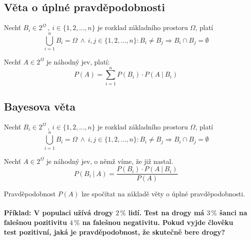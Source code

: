 \subsection{Věta o úplné pravděpodobnosti}

\begin{compactitem}
    \item Nechť $B_i \in 2^{\Omega} ~,~ i \in \{ 1, 2, \ldots, n \}$ je rozklad základního prostoru $\Omega$, platí
    $$ \bigcup_{i=1}^n B_i = \Omega ~\land~ i, j \in \{ 1, 2, \ldots, n \} : B_i \not= B_j \Rightarrow B_i \cap B_j = \emptyset $$

    \item Nechť $A \in 2^{\Omega}$ je náhodný jev, platí:
    $$ P(A) = \sum_{i=1}^n P(B_i) \cdot P(A ~|~ B_i) $$
\end{compactitem}

\subsection{Bayesova věta}

\begin{compactitem}
    \item Nechť $B_i \in 2^{\Omega} ~,~ i \in \{ 1, 2, \ldots, n \}$ je rozklad základního prostoru $\Omega$, platí
    $$ \bigcup_{i=1}^n B_i = \Omega ~\land~ i, j \in \{ 1, 2, \ldots, n \} : B_i \not= B_j \Rightarrow B_i \cap B_j = \emptyset $$

    \item Nechť $A \in 2^{\Omega}$ je náhodný jev, o němž víme, že již nastal.
    $$ P(B_i ~|~ A) = \frac{P(B_i) \cdot P(A ~|~ B_i)}{P(A)}$$

    \item Pravděpodobnost $P(A)$ lze spočítat na základě věty o úplné pravděpodobnosti.
\end{compactitem}

\paragraph*{Příklad: V populaci užívá drogy $2\,\%$ lidí. Test na drogy má $3\,\%$ šanci na falešnou pozitivitu $4\,\%$ na falešnou negativitu. Pokud vyjde člověku test pozitivní, jaká je pravděpodobnost, že skutečně bere drogy?}

